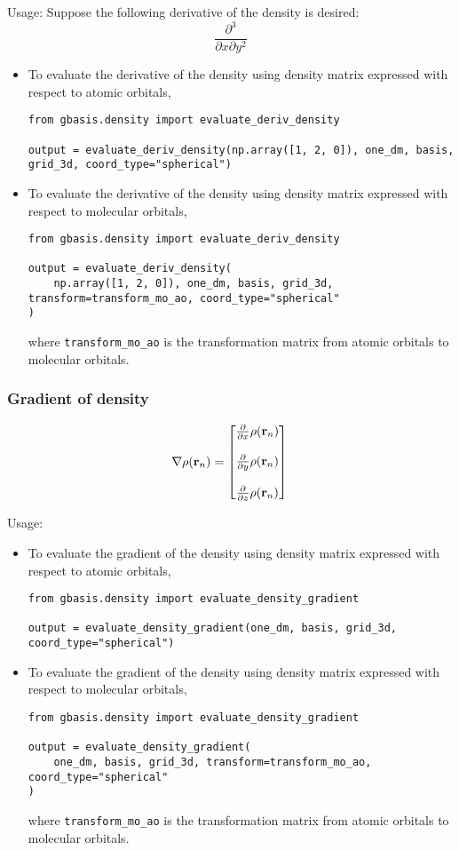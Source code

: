 \documentclass[letterpaper]{article}
\begin{document}
Usage:
Suppose the following derivative of the density is desired:
\begin{equation}
  \frac{\partial^3}{\partial x \partial y^2}
\end{equation}
\begin{itemize}
\item To evaluate the derivative of the density using density matrix expressed
  with respect to atomic orbitals,
\begin{verbatim}
from gbasis.density import evaluate_deriv_density

output = evaluate_deriv_density(np.array([1, 2, 0]), one_dm, basis, grid_3d, coord_type="spherical")
\end{verbatim}
\item To evaluate the derivative of the density using density matrix expressed
  with respect to molecular orbitals,
\begin{verbatim}
from gbasis.density import evaluate_deriv_density

output = evaluate_deriv_density(
    np.array([1, 2, 0]), one_dm, basis, grid_3d, transform=transform_mo_ao, coord_type="spherical"
)
\end{verbatim}
  where
  \verb|transform_mo_ao| is the transformation matrix from atomic orbitals
  to molecular orbitals.
\end{itemize}
\subsubsection{Gradient of density}
\begin{equation}
  \nabla \rho(\mathbf{r}_n)
  =
  \begin{bmatrix}
    \frac{\partial}{\partial x} \rho(\mathbf{r}_n)\\\\
    \frac{\partial}{\partial y} \rho(\mathbf{r}_n)\\\\
    \frac{\partial}{\partial z} \rho(\mathbf{r}_n)
  \end{bmatrix}\\
\end{equation}

Usage:
\begin{itemize}
\item To evaluate the gradient of the density using density matrix expressed
  with respect to atomic orbitals,
\begin{verbatim}
from gbasis.density import evaluate_density_gradient

output = evaluate_density_gradient(one_dm, basis, grid_3d, coord_type="spherical")
\end{verbatim}
\item To evaluate the gradient of the density using density matrix expressed
  with respect to molecular orbitals,
\begin{verbatim}
from gbasis.density import evaluate_density_gradient

output = evaluate_density_gradient(
    one_dm, basis, grid_3d, transform=transform_mo_ao, coord_type="spherical"
)
\end{verbatim}
  where
  \verb|transform_mo_ao| is the transformation matrix from atomic orbitals
  to molecular orbitals.
\end{itemize}
\end{document}
